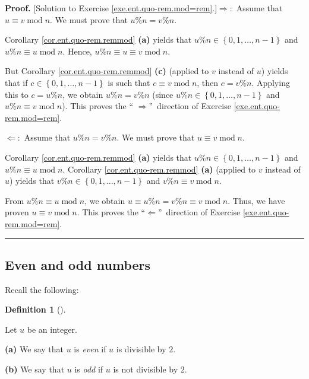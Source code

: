\documentclass[numbers=enddot,12pt,final,onecolumn,notitlepage]{scrartcl}%
\numberwithin{exer}{subsection}
\theoremstyle{definition}
\newtheorem{defi}[theo]{Definition}
\newenvironment{definition}[1][]
{\begin{defi}[#1]\begin{leftbar}}
{\end{leftbar}\end{defi}}
\newenvironment{fineprint}{\begin{small}}{\end{small}}
\newenvironment{proof}[1][Proof]{\noindent\textbf{#1.} }{\ \rule{0.5em}{0.5em}}
\begin{document}
\begin{fineprint}
\begin{proof}
[Solution to Exercise \ref{exe.ent.quo-rem.mod=rem}.]$\Longrightarrow:$ Assume
that $u\equiv v\operatorname{mod}n$. We must prove that $u\%n=v\%n$.

Corollary \ref{cor.ent.quo-rem.remmod} \textbf{(a)} yields that $u\%n\in
\left\{  0,1,\ldots,n-1\right\}  $ and $u\%n\equiv u\operatorname{mod}n$.
Hence, $u\%n\equiv u\equiv v\operatorname{mod}n$.

But Corollary \ref{cor.ent.quo-rem.remmod} \textbf{(c)} (applied to $v$
instead of $u$) yields that if $c\in\left\{  0,1,\ldots,n-1\right\}  $ is such
that $c\equiv v\operatorname{mod}n$, then $c=v\%n$. Applying this to $c=u\%n$,
we obtain $u\%n=v\%n$ (since $u\%n\in\left\{  0,1,\ldots,n-1\right\}  $ and
$u\%n\equiv v\operatorname{mod}n$). This proves the \textquotedblleft%
$\Longrightarrow$\textquotedblright\ direction of Exercise
\ref{exe.ent.quo-rem.mod=rem}.

$\Longleftarrow:$ Assume that $u\%n=v\%n$. We must prove that $u\equiv
v\operatorname{mod}n$.

Corollary \ref{cor.ent.quo-rem.remmod} \textbf{(a)} yields that $u\%n\in
\left\{  0,1,\ldots,n-1\right\}  $ and $u\%n\equiv u\operatorname{mod}n$.
Corollary \ref{cor.ent.quo-rem.remmod} \textbf{(a)} (applied to $v$ instead of
$u$) yields that $v\%n\in\left\{  0,1,\ldots,n-1\right\}  $ and $v\%n\equiv
v\operatorname{mod}n$.

From $u\%n\equiv u\operatorname{mod}n$, we obtain $u\equiv u\%n=v\%n\equiv
v\operatorname{mod}n$. Thus, we have proven $u\equiv v\operatorname{mod}n$.
This proves the \textquotedblleft$\Longleftarrow$\textquotedblright\ direction
of Exercise \ref{exe.ent.quo-rem.mod=rem}.
\end{proof}
\end{fineprint}

\subsection{Even and odd numbers}

Recall the following:

\begin{definition}
\label{def.ent.even-odd}Let $u$ be an integer.

\textbf{(a)} We say that $u$ is \textit{even} if $u$ is divisible by $2$.

\textbf{(b)} We say that $u$ is \textit{odd }if $u$ is not divisible by $2$.
\end{definition}
\end{document}
